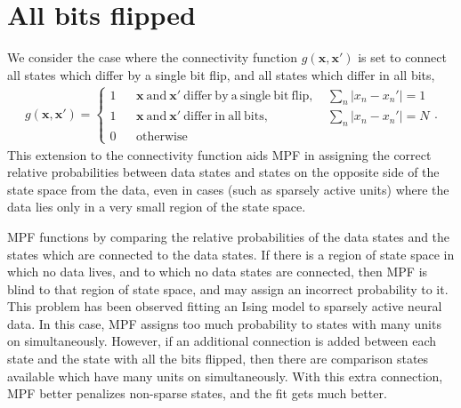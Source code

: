 \documentclass{article}
\newcommand{\mb}{\mathbf}
\begin{document}
\section{All bits flipped}\label{sec all bit}

We consider the case where the connectivity function $g\left( \mb x, \mb x' \right)$ is set to connect all states which differ by a single bit flip, and all states which differ in all bits,
\begin{align}
g\left( \mb x, \mb x' \right)
 =
	\left\{\begin{array}{ccrl}
1 & & \mb x \mathrm{\ and\ } \mb x' \mathrm{\ differ\ by\ a\ single\ bit\ flip,\ } & \sum_n \left| x_n - x_n' \right| = 1 \\ %
1 & & \mb x \mathrm{\ and\ } \mb x' \mathrm{\ differ\ in\ all\ bits,\ } & \sum_n \left| x_n - x_n' \right| = N \\ %
0 & & \mathrm{otherwise} & 
	\end{array}\right.
\label{trans}
.
\end{align}
This extension to the connectivity function aids MPF in assigning the correct relative probabilities between data states and states on the opposite side of the state space from the data, even in cases (such as sparsely active units) where the data lies only in a very small region of the state space.

MPF functions by comparing the relative probabilities of the data states and the states which are connected to the data states.  If there is a region of state space in which no data lives, and to which no data states are connected, then MPF is blind to that region of state space, and may assign an incorrect probability to it.  This problem has been observed fitting an Ising model to sparsely active neural data.  In this case, MPF assigns too much probability to states with many units on simultaneously.  However, if an additional connection is added between each state and the state with all the bits flipped, then there are comparison states available which have many units on simultaneously.  With this extra connection, MPF better penalizes non-sparse states, and the fit gets much better.
\end{document}
